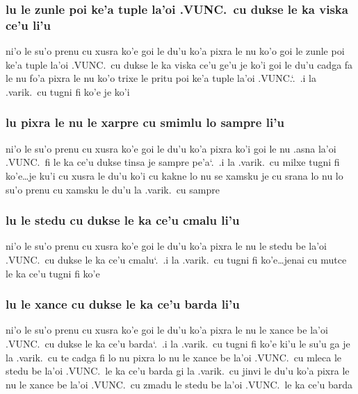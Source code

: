 \documentclass{report}
\newcommand\sds{\spacefactor\sfcode`.\ \space}
\begin{document}
\subsubsection{lu le zunle poi ke'a tuple la'oi .VUNC.\ cu dukse le ka viska ce'u li'u}
ni'o le su'o prenu cu xusra ko'e goi le du'u ko'a pixra le nu ko'o goi le zunle poi ke'a tuple la'oi .VUNC.\ cu dukse le ka viska ce'u ge'u je ko'i goi le du'u cadga fa le nu fo'a pixra le nu ko'o trixe le pritu poi ke'a tuple la'oi .VUNC.\sds  .i la .varik.\ cu tugni fi ko'e je ko'i

\subsubsection{lu pixra le nu le xarpre cu smimlu lo sampre li'u}
ni'o le su'o prenu cu xusra ko'e goi le du'u ko'a pixra ko'i goi le nu .asna la'oi .VUNC.\ fi le ka ce'u dukse tinsa je sampre pe'a\sds  .i la .varik.\ cu milxe tugni fi ko'e\ldots je ku'i cu xusra le du'u ko'i cu kakne lo nu se xamsku je cu srana lo nu lo su'o prenu cu xamsku le du'u la .varik.\ cu sampre

\subsubsection{lu le stedu cu dukse le ka ce'u cmalu li'u}
ni'o le su'o prenu cu xusra ko'e goi le du'u ko'a pixra le nu le stedu be la'oi .VUNC.\ cu dukse le ka ce'u cmalu\sds  .i la .varik.\ cu tugni fi ko'e\ldots jenai cu mutce le ka ce'u tugni fi ko'e

\subsubsection{lu le xance cu dukse le ka ce'u barda li'u}
ni'o le su'o prenu cu xusra ko'e goi le du'u ko'a pixra le nu le xance be la'oi .VUNC.\ cu dukse le ka ce'u barda\sds  .i la .varik.\ cu tugni fi ko'e ki'u le su'u ga je la .varik.\ cu te cadga fi lo nu pixra lo nu le xance be la'oi .VUNC.\ cu mleca le stedu be la'oi .VUNC.\ le ka ce'u barda gi la .varik.\ cu jinvi le du'u ko'a pixra le nu le xance be la'oi .VUNC.\ cu zmadu le stedu be la'oi .VUNC.\ le ka ce'u barda
\end{document}

